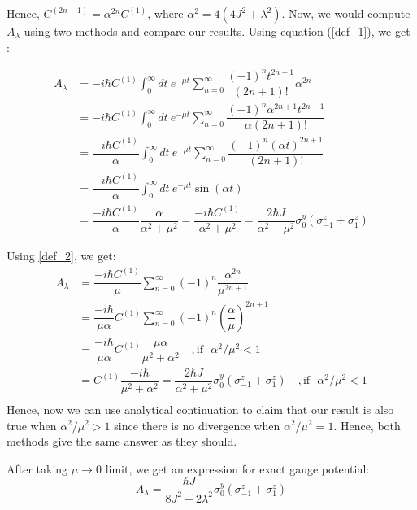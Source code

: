 \documentclass[11pt,a4paper]{article}
\begin{document}
Hence, $C^{(2n+1)}= \alpha^{2n} C^{(1)}$, where $\alpha^2= 4 (4 J^2 +  \lambda ^2) $. Now, we would compute $A_{\lambda}$ using two methods and compare our results. Using equation (\ref{def_1}), we get :

\begin{align*}
A_{\lambda} &= -i \hbar    C^{(1)} \int_0^{\infty} dt\ e^{-\mu t} \sum_{n=0}^{\infty} \dfrac{(-1)^{n} t ^{2n+1}}{(2n+1)!}  \alpha^{2n}  \\
 &= -i \hbar    C^{(1)} \int_0^{\infty} dt\ e^{-\mu t} \sum_{n=0}^{\infty} \dfrac{(-1)^{n}  \alpha^{2n+1} t ^{2n+1}}{\alpha(2n+1)!}   \\
  &= \dfrac{-i \hbar    C^{(1)}}{\alpha} \int_0^{\infty} dt\ e^{-\mu t} \sum_{n=0}^{\infty} \dfrac{(-1)^{n}  (\alpha t)^{2n+1}}{(2n+1)!}   \\
    &= \dfrac{-i \hbar    C^{(1)}}{\alpha} \int_0^{\infty} dt\ e^{-\mu t}  \sin  (\alpha t)   \\
     &= \dfrac{-i \hbar    C^{(1)}}{\alpha} \dfrac{\alpha}{\alpha^2 + \mu^2} =\dfrac{-i \hbar    C^{(1)}}{{\alpha^2 + \mu^2}} =  \dfrac{2 \hbar J}{{\alpha^2 + \mu^2}} \sigma_0^y ( \sigma_{-1}^z + \sigma_1^z) 
\end{align*}
 

Using \ref{def_2}, we get: %
\begin{align*}
A_{\lambda} &=  \dfrac{-i \hbar   C^{(1)}}{\mu}\sum_{n=0}^{\infty}   (-1)^{n} \dfrac{ \alpha^{2n}}{\mu^{2n+1}} \\
&=  \dfrac{-i \hbar }{\mu \alpha}  C^{(1)}\sum_{n=0}^{\infty}   (-1)^{n} \left(\dfrac{ \alpha}{\mu} \right)^{2n+1} \\
&=  \dfrac{-i \hbar }{\mu \alpha}  C^{(1)} \dfrac{\mu \alpha}{ \mu^2 + \alpha^2}\quad, \mbox{if ~}\alpha^2 / \mu^2 <1 \\
&=    C^{(1)}  \dfrac{ -i\hbar  }{ \mu^2 + \alpha^2}= \dfrac{2 \hbar J}{{\alpha^2 + \mu^2}} \sigma_0^y ( \sigma_{-1}^z + \sigma_1^z) \quad, \mbox{if ~} \alpha^2 / \mu^2 <1 \\
\end{align*}
Hence, now we can use analytical continuation to claim that our result is also true when $\alpha^2 / \mu^2 >1$ since there is no divergence when $\alpha^2 / \mu^2 =1$. Hence, both methods give the same answer as they should.

After taking $\mu \rightarrow 0$ limit, we get an expression for exact gauge potential:
\begin{equation}
\boxed{ A_{\lambda} = \dfrac{\hbar J}{{8 J^2 + 2 \lambda ^2 }} \sigma_0^y ( \sigma_{-1}^z + \sigma_1^z)}
\end{equation}
\end{document}

